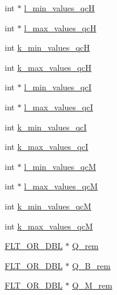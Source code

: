 \begin{DoxyCompactItemize}
\item 
int $\ast$ \mbox{\hyperlink{struct_two_dpfold__vars_a340b77358b5526f4c1a103d16c063fd7}{l\+\_\+min\+\_\+values\+\_\+qcH}}
\item 
int $\ast$ \mbox{\hyperlink{struct_two_dpfold__vars_a88fa363302685d07b35617a7827718fd}{l\+\_\+max\+\_\+values\+\_\+qcH}}
\item 
int \mbox{\hyperlink{struct_two_dpfold__vars_afe32932a2e2d8fa91f07a7428234cc89}{k\+\_\+min\+\_\+values\+\_\+qcH}}
\item 
int \mbox{\hyperlink{struct_two_dpfold__vars_a3864c94a156f27eca22e6e334d81b84b}{k\+\_\+max\+\_\+values\+\_\+qcH}}
\item 
int $\ast$ \mbox{\hyperlink{struct_two_dpfold__vars_a8e94f36138ff5bb1dbbd09861fa94661}{l\+\_\+min\+\_\+values\+\_\+qcI}}
\item 
int $\ast$ \mbox{\hyperlink{struct_two_dpfold__vars_abbdff88571d22849621d5624ea426045}{l\+\_\+max\+\_\+values\+\_\+qcI}}
\item 
int \mbox{\hyperlink{struct_two_dpfold__vars_a9246bd9fc33e1a3111d20b9dabeca8e8}{k\+\_\+min\+\_\+values\+\_\+qcI}}
\item 
int \mbox{\hyperlink{struct_two_dpfold__vars_ab0546202982af7d4362ebd0d903f78ce}{k\+\_\+max\+\_\+values\+\_\+qcI}}
\item 
int $\ast$ \mbox{\hyperlink{struct_two_dpfold__vars_ae16b98215c9664d6a78c9fe4afadb17c}{l\+\_\+min\+\_\+values\+\_\+qcM}}
\item 
int $\ast$ \mbox{\hyperlink{struct_two_dpfold__vars_a33bcaa57cdee87495cc4ad5bc72666e8}{l\+\_\+max\+\_\+values\+\_\+qcM}}
\item 
int \mbox{\hyperlink{struct_two_dpfold__vars_abede310aa070713226ddad5d617619f3}{k\+\_\+min\+\_\+values\+\_\+qcM}}
\item 
int \mbox{\hyperlink{struct_two_dpfold__vars_a4a1993d89e7f84824deb48408df8579d}{k\+\_\+max\+\_\+values\+\_\+qcM}}
\item 
\mbox{\hyperlink{group__data__structures_ga31125aeace516926bf7f251f759b6126}{F\+L\+T\+\_\+\+O\+R\+\_\+\+D\+BL}} $\ast$ \mbox{\hyperlink{struct_two_dpfold__vars_a8cdb526d5dd01cb96f8aadc108469cb7}{Q\+\_\+rem}}
\item 
\mbox{\hyperlink{group__data__structures_ga31125aeace516926bf7f251f759b6126}{F\+L\+T\+\_\+\+O\+R\+\_\+\+D\+BL}} $\ast$ \mbox{\hyperlink{struct_two_dpfold__vars_af0996736f7ab00dc604ca5f55e92e6e2}{Q\+\_\+\+B\+\_\+rem}}
\item 
\mbox{\hyperlink{group__data__structures_ga31125aeace516926bf7f251f759b6126}{F\+L\+T\+\_\+\+O\+R\+\_\+\+D\+BL}} $\ast$ \mbox{\hyperlink{struct_two_dpfold__vars_aa11ef78b6011ccef34ea4899767ac5d7}{Q\+\_\+\+M\+\_\+rem}}

\end{DoxyCompactItemize}
